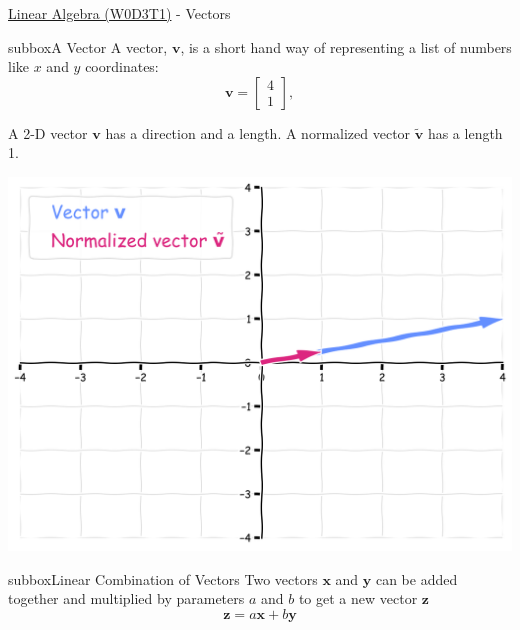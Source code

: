 \begin{textbox}{\href{https://compneuro.neuromatch.io/tutorials/W0D3_LinearAlgebra/student/W0D3_Tutorial1.html}{Linear Algebra (W0D3T1)} - Vectors}
\begin{subbox}{subbox}{A Vector}
\scriptsize
A vector, $\mathbf{v}$, is a short hand way of representing a list of numbers like $x$ and $y$ coordinates:
\begin{equation}
\mathbf{v} = 
\begin{bmatrix}
4 \\
1
\end{bmatrix},
\end{equation}

A 2-D vector $\mathbf{v}$ has a direction and a length. A normalized vector $\widetilde{\mathbf{v}}$ has a length 1.

\centering
\includegraphics[scale=0.1]{Figures/PreCourse/Figure1.png}
\end{subbox}

\begin{subbox}{subbox}{Linear Combination of Vectors}
\scriptsize
Two vectors $\mathbf{x}$ and $\mathbf{y}$ can be added together and multiplied by parameters $a$ and $b$ to get a new vector $\mathbf{z}$
\begin{equation}
\mathbf{z} = a\mathbf{x} + b\mathbf{y}
\end{equation}


\end{subbox}
\end{textbox}
